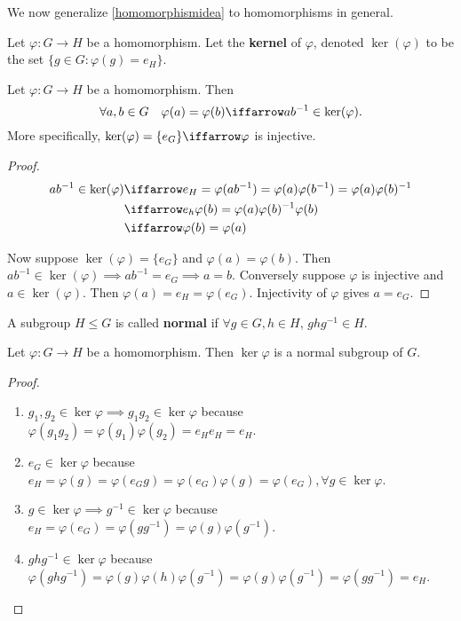 We now generalize \ref{homomorphismidea} to homomorphisms in general.

\begin{df}
Let $\varphi : G \to H$ be a homomorphism. Let the \textbf{kernel} of
$\varphi$, denoted $\ker(\varphi)$ to be the set $\lbrace g \in G :
\varphi(g) = e_H \rbrace$.
\end{df}

\begin{prop}
Let $\varphi : G \to H$ be a homomorphism. Then
\[ \forall a, b \in G \quad \varphi(a) = \varphi(b) \iffarrow ab^{-1}
\in \ker(\varphi). \]
More specifically, $\ker(\varphi) = \lbrace e_G \rbrace \iffarrow
\varphi$ is injective.
\end{prop}

\begin{proof}
\[ \begin{aligned}
ab^{-1} \in \ker(\varphi) &\iffarrow e_H = \varphi(ab^{-1}) = \varphi(a)
\varphi(b^{-1}) = \varphi(a) \varphi(b)^{-1} \\
&\iffarrow e_h \varphi(b) = \varphi(a) \varphi(b)^{-1} \varphi(b) \\
&\iffarrow \varphi(b) = \varphi(a) \\
\end{aligned} \]

Now suppose $\ker(\varphi) = \lbrace e_G \rbrace$ and $\varphi(a) =
\varphi(b)$. Then $ab^{-1} \in \ker(\varphi) \implies ab^{-1} = e_G
\implies a = b$. Conversely suppose $\varphi$ is injective and $a \in
\ker(\varphi)$. Then $\varphi(a) = e_H = \varphi(e_G)$. Injectivity of
$\varphi$ gives $a = e_G$.
\end{proof}

\begin{df}
A subgroup $H \leq G$ is called \textbf{normal} if $\forall g \in G, h
\in H$, $ghg^{-1} \in H$.
\end{df}

\begin{prop}
Let $\varphi : G \to H$ be a homomorphism. Then $\ker \varphi$ is a
normal subgroup of $G$.
\end{prop}

\begin{proof}
$ $
\begin{enumerate}
\item $g_1, g_2 \in \ker \varphi \implies g_1 g_2 \in \ker \varphi$ because
$\varphi(g_1 g_2) = \varphi(g_1) \varphi(g_2) = e_H e_H = e_H$.
\item $e_G \in \ker \varphi$ because $e_H = \varphi(g) = \varphi(e_G g)
= \varphi(e_G) \varphi(g) = \varphi(e_G), \forall g \in \ker \varphi$.
\item $g \in \ker \varphi \implies g^{-1} \in \ker \varphi$ because $e_H
= \varphi(e_G) = \varphi(g g^{-1}) = \varphi(g) \varphi(g^{-1})$.
\item $ghg^{-1} \in \ker \varphi$ because $\varphi(ghg^{-1}) =
\varphi(g) \varphi(h) \varphi(g^{-1}) = \varphi(g) \varphi(g^{-1}) =
\varphi(gg^{-1}) = e_H$.
\end{enumerate}
\end{proof}

